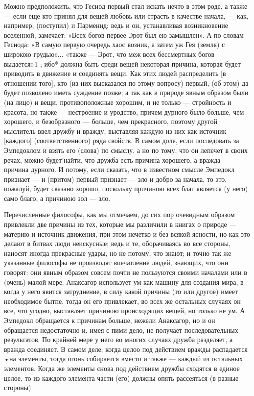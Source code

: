 \documentclass{article}
\begin{document}
Можно предположить, что Гесиод первый стал искать нечто в этом роде, а также --- если еще кто принял для вещей любовь или страсть в качестве начала, --- как, например, (поступил) и Парменид: ведь и он, устанавливая возникновение вселенной, замечает: «Всех богов первее Эрот был ею замышлен». А по словам Гесиода:
\footnotemark[1]
«В самую первую очередь хаос возник, а затем уж Гея (земля) с широкою грудью»... «также --- Эрот, что меж всех бессмертных богов выдается»1 ; ибо* должна быть среди вещей некоторая причина, которая будет приводить в движение и соединять вещи. Как этих людей распределить [в отношении того], кто (из них высказался по этому вопросу) первый, (об этом) да будет позволено иметь суждение позже; а так как в природе явным образом были (на лицо) и вещи, противоположные хорошим, и не только --- стройность и красота, но также --- нестроение и уродство, причем дурного было больше, чем хорошего, и безобразного --- больше, чем прекрасного, поэтому другой мыслитель ввел дружбу и вражду, выставляя каждую из них как источник [каждого] (соответственного) ряда свойств. В самом доле, если последовать за Эмпедоклом и взять его (слова) по смыслу, а но по тому, что он лепечет в своих речах, можно будет'найти, что дружба есть причина хорошего, а вражда --- причина дурного. И потому, если сказать, что в известном смысле Эмпедокл признает --- и (притом) первый признает --- зло и добро за начала, то это, пожалуй, будет сказано хорошо, поскольку причиною всех благ является (у него) само благо, а причиною зол --- зло.

Перечисленные философы, как мы отмечаем, до сих пор очевидным образом привлекли две причины из тех, которые мы различили в книгах о природе
\footnotemark[2]
 --- материю и источник движения, при этом нечетко и без всякой ясности, но как это делают в битвах люди неискусные; ведь и те, оборачиваясь во все стороны, наносят иногда прекрасные удары, но не потому, что знают; и точно так же указанные философы не производят впечатление людей, знающих, что они говорят: они явным образом совсем почти не пользуются своими началами или в (очень) малой мере. Анаксагор использует ум как машину для создания мира, в когда у него явится затруднение, в силу какой причины (то или другое) имеет необходимое бытпе, тогда он его привлекает, во всех же остальных случаях он все, что угодно, выставляет причиною происходящих вещей, но только не ум.
\footnotemark[3]
А Эмпедокл обращается к причинам больше, нежели Анаксагор, но и он обращается недостаточно и, имея с пими дело, не получает последовательных результатов. По крайней мере у него во многих случаях дружба разделяет, а вражда соединяет. В самом деле, когда целоо под действием вражды распадается •на элементы, тогда огонь собирается вместо и также --- каждый из остальных элементов. Когда же элементы снова под действием дружбы сходятся в единое целое, то из каждого элемента части (его) должны опять рассеяться (в разные стороны).
\end{document}
